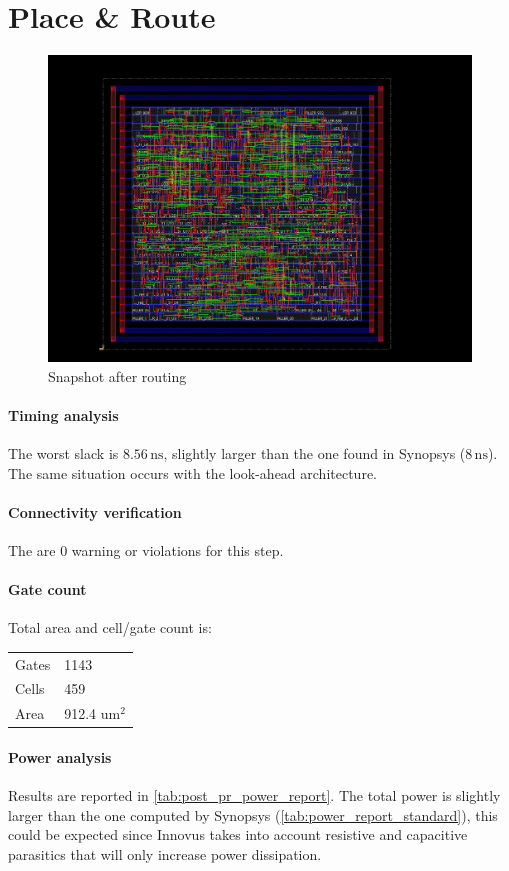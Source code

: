 \section{Place \& Route}
\begin{figure}
		\includegraphics[width=\textwidth]{./chapter5/pic.jpg}
		\caption{Snapshot after routing}
\end{figure}

\paragraph{Timing analysis} The worst slack is $8.56\,\textrm{ns}$, slightly larger than the one found in Synopsys ($8\,\textrm{ns}$). The same situation occurs with the look-ahead architecture.


\paragraph{Connectivity verification} The are 0 warning or violations for this step.


\paragraph{Gate count} Total area and cell/gate count is:
\begin{center}
    \begin{tabular}{|l|l|}
	   \hline
	   Gates & 1143 \\
	   Cells &     459 \\
	   Area &     912.4 um$^2$\\\hline
    \end{tabular}
\end{center}


\paragraph{Power analysis} Results are reported in \autoref{tab:post_pr_power_report}. The total power is slightly larger than the one computed by Synopsys (\autoref{tab:power_report_standard}), this could be expected since Innovus takes into account resistive and capacitive parasitics that will only increase power dissipation.


